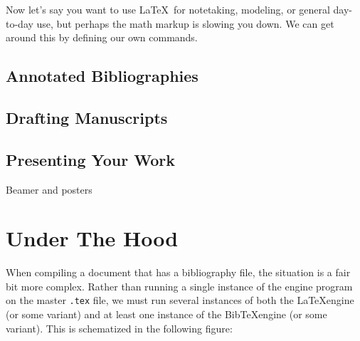 \documentclass[justified]{tufte-handout}
\begin{document}
Now let's say you want to use \LaTeX\ for notetaking, modeling, or general day-to-day use, but perhaps the math markup is slowing you down. We can get around this by defining our own commands.\\






\subsection{Annotated Bibliographies}



\subsection{Drafting Manuscripts}





\subsection{Presenting Your Work}

Beamer and posters



\section{Under The Hood}

When compiling a document that has a bibliography file, the situation is a fair bit more complex. Rather than running a single instance of the engine program on the master \texttt{.tex} file, we must run several instances of both the \LaTeX engine (or some variant) and at least one instance of the Bib\TeX engine (or some variant). This is schematized in the following figure:
\end{document}

